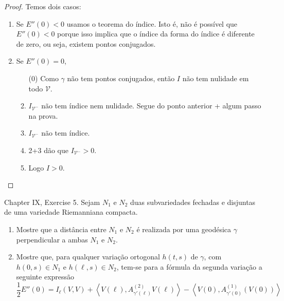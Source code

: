 \begin{proof}
Temos dois casos:
\begin{enumerate}
\item Se $E''(0)<0$ usamos o teorema do índice. Isto é, não é possível que
 $E''(0)<0$ porque isso implica que o índice da forma do índice é diferente
 de zero, ou seja, existem pontos conjugados.
\item Se $E''(0)=0$,
\begin{enumerate}
\item[(0)] Como $\gamma$ não tem pontos conjugados, então $I$ não tem
nulidade em todo  $\mathcal{V}$.
\item $I_{\mathcal{V}^-}$ não tem índice nem nulidade. Segue do ponto anterior + 
algum passo na prova.
\item $I_{\mathcal{V}^-}$ não tem índice.
\item 2+3 dão que $I_{\mathcal{V}^-}>0$.
\item Logo $I>0$.
\end{enumerate}
\end{enumerate}
\end{proof}

\begin{exercise}
\label{exercise-two-submanifolds}
\cite{doc} Chapter IX, Exercise 5. Sejam $N_1$ e $N_2$ duas subvariedades
 fechadas e disjuntas de uma variedade Riemanniana compacta.
\begin{enumerate}
\item Mostre que a distância entre $N_1$ e $N_2$ é realizada por uma geodésica
	$\gamma$ perpendicular a ambas $N_1$ e $N_2$.
\item Mostre que, para qualquer variação ortogonal $h(t,s)$ de $\gamma$, com
$h(0,s) \in N_1$ e $h(\ell,s) \in N_2$, tem-se para a fórmula da segunda
variação a seguinte expressão
$$
\frac{1}{2}E''(0)=I_{\ell}(V,V)+
\left<V(\ell),A_{\gamma'(\ell)}^{(2)}V(\ell)\right>
-\left<V(0),A^{(1)}_{\gamma'(0)}(V(0))\right>
$$
\end{enumerate}
\end{exercise}

